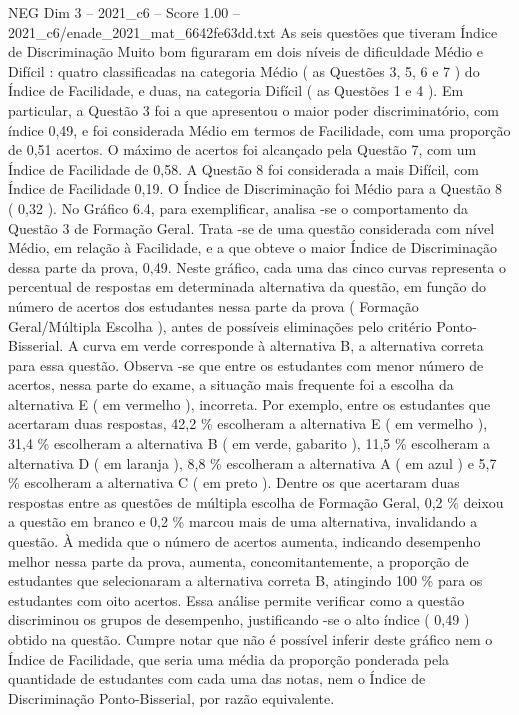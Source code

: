 \begin{textsample}{NEG Dim 3 – 2021\_c6 – Score 1.00 – 2021\_c6/enade\_2021\_mat\_6642fe63dd.txt}
As seis questões que tiveram Índice de Discriminação Muito bom figuraram em dois níveis de dificuldade Médio e Difícil : quatro classificadas na categoria Médio ( as Questões 3, 5, 6 e 7 ) do Índice de Facilidade, e duas, na categoria Difícil ( as Questões 1 e 4 ).
Em particular, a Questão 3 foi a que apresentou o maior poder discriminatório, com índice 0,49, e foi considerada Médio em termos de Facilidade, com uma proporção de 0,51 acertos.
O máximo de acertos foi alcançado pela Questão 7, com um Índice de Facilidade de 0,58.
A Questão 8 foi considerada a mais Difícil, com Índice de Facilidade 0,19.
O Índice de Discriminação foi Médio para a Questão 8 ( 0,32 ).
No Gráfico 6.4, para exemplificar, analisa -se o comportamento da Questão 3 de Formação Geral.
Trata -se de uma questão considerada com nível Médio, em relação à Facilidade, e a que obteve o maior Índice de Discriminação dessa parte da prova, 0,49.
Neste gráfico, cada uma das cinco curvas representa o percentual de respostas em determinada alternativa da questão, em função do número de acertos dos estudantes nessa parte da prova ( Formação Geral/Múltipla Escolha ), antes de possíveis eliminações pelo critério Ponto-Bisserial.
A curva em verde corresponde à alternativa B, a alternativa correta para essa questão.
Observa -se que entre os estudantes com menor número de acertos, nessa parte do exame, a situação mais frequente foi a escolha da alternativa E ( em vermelho ), incorreta.
Por exemplo, entre os estudantes que acertaram duas respostas, 42,2 \% escolheram a alternativa E ( em vermelho ), 31,4 \% escolheram a alternativa B ( em verde, gabarito ), 11,5 \% escolheram a alternativa D ( em laranja ), 8,8 \% escolheram a alternativa A ( em azul ) e 5,7 \% escolheram a alternativa C ( em preto ).
Dentre os que acertaram duas respostas entre as questões de múltipla escolha de Formação Geral, 0,2 \% deixou a questão em branco e 0,2 \% marcou mais de uma alternativa, invalidando a questão.
À medida que o número de acertos aumenta, indicando desempenho melhor nessa parte da prova, aumenta, concomitantemente, a proporção de estudantes que selecionaram a alternativa correta B, atingindo 100 \% para os estudantes com oito acertos.
Essa análise permite verificar como a questão discriminou os grupos de desempenho, justificando -se o alto índice ( 0,49 ) obtido na questão.
Cumpre notar que não é possível inferir deste gráfico nem o Índice de Facilidade, que seria uma média da proporção ponderada pela quantidade de estudantes com cada uma das notas, nem o Índice de Discriminação Ponto-Bisserial, por razão equivalente.

\end{textsample}
